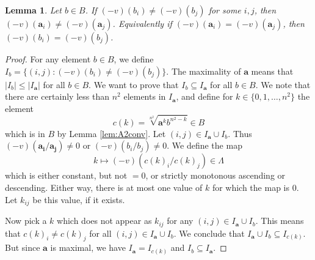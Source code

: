 \documentclass[12pt]{amsart}
\newcommand{\N}{\mathbb{N} }
\newcommand{\B}{\mathcal{B}}
\numberwithin{equation}{section}
\newtheorem{lemma}[theorem]{Lemma}
\theoremstyle{remark} %
\begin{document}
\begin{lemma}
	\label{lem:A2regular}
	Let $b \in B$. If $(-v)(b_i)\neq(-v)(b_j)$ for some $i,j$, then $(-v)(\pmb{a}_i)\neq(-v)(\pmb{a}_j)$. Equivalently if $(-v)(\pmb{a}_i) =(-v)(\pmb{a}_j)$, then $(-v)(b_i) = (-v)(b_j)$.
\end{lemma}
\begin{proof}
	For any element $b \in B$, we define $I_b = \{ (i,j) \colon (-v)(b_i) \neq (-v)(b_j) \}$. The maximality of $\pmb{a}$ means that $|I_b|\leq |I_{\pmb{a}} |$ for all $b \in B$. We want to prove that $I_b \subseteq I_{\pmb{a}}$ for all $b\in B$. We note that there are certainly less than $n^2$ elements in $I_{\pmb{a}}$, and define for $k \in \{0 , 1 , \ldots , n^2  \}$ the element
	$$
	c(k)=\sqrt[n^2]{\pmb{a}^{k} b^{n^2-k}} \in B 
	$$
	which is in $B$ by Lemma \ref{lem:A2conv}. Let $(i,j) \in I_{\pmb{a}} \cup I_b$. Thus $(-v)(\pmb{a_i}/\pmb{a_j}) \neq 0$ or $(-v)(b_i/b_j) \neq 0$. We define the map
	$$
	k \mapsto (-v)( c(k)_i / c(k)_j ) \in \Lambda
	$$
	which is either constant, but not $=0$, or strictly monotonous ascending or descending. Either way, there is at most one value of $k$ for which the map is $0$. Let $k_{ij}$ be this value, if it exists. 
	
	Now pick a $k$ which does not appear as $k_{ij}$ for any $(i,j) \in I_{\pmb{a}} \cup I_b$. This means that $c(k)_i \neq c(k)_j$ for all $(i,j) \in I_{\pmb{a}} \cup I_b$. We conclude that $I_{\pmb{a}} \cup I_b \subseteq I_{c(k)}$. But since $\pmb{a}$ is maximal, we have $I_{\pmb{a}} = I_{c(k)}$ and $I_b \subseteq I_{\pmb{a}}$.
\end{proof}
\end{document}
